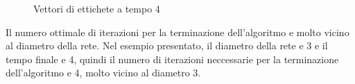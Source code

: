 \documentclass[a4paper,12pt]{report}
\begin{document}
		\begin{center}
			\begin{figure}[H]
				\centering
				\qquad
				\qquad
				\qquad

				\caption{Vettori di ettichete a tempo 4}
			\end{figure}
		\end{center}

		Il numero ottimale di iterazioni per la terminazione dell'algoritmo e molto vicino al diametro della rete. Nel esempio presentato, il diametro della rete e 3 e il tempo finale e 4, quindi il numero di iterazioni neccessarie per la terminazione dell'algoritmo e 4, molto vicino al diametro 3.
\end{document}
